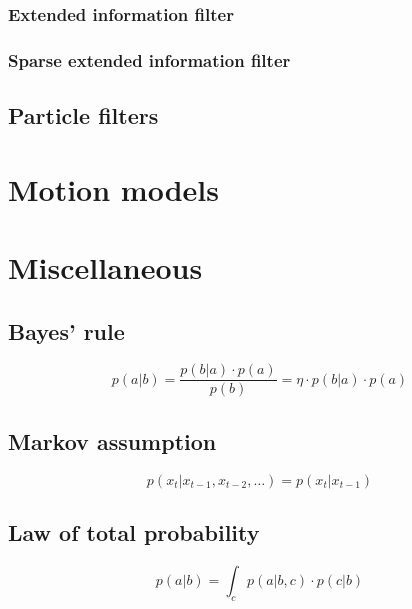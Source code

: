 \documentclass{article}
\begin{document}
\subsubsection{Extended information filter}

\subsubsection{Sparse extended information filter}

\subsection{Particle filters}

\section{Motion models}

\section{Miscellaneous}

\subsection{Bayes' rule}
\begin{equation}\label{bayes}
  p(a \vert b) = \frac{p(b \vert a) \cdot p(a)}{p(b)}
    = \eta \cdot p(b \vert a) \cdot p(a)
\end{equation}

\subsection{Markov assumption}
\begin{equation}\label{markov}
  p(x_t \vert x_{t-1}, x_{t-2}, \dots) = p(x_t \vert x_{t-1})
\end{equation}

\subsection{Law of total probability}
\begin{equation}\label{totalprobability}
  p(a \vert b) = \int_{c} p(a \vert b, c) \cdot p(c \vert b)
\end{equation}

\printbibliography{}
\end{document}
